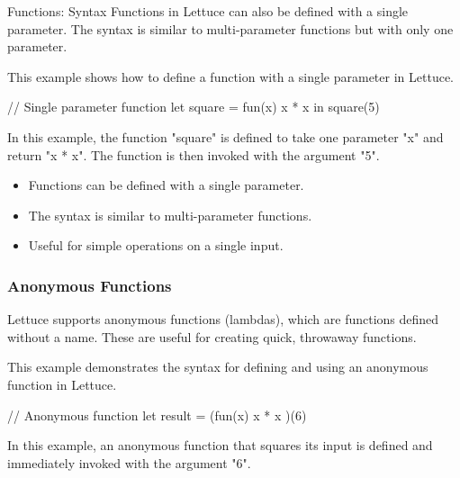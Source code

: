 \begin{notes}{Functions: Syntax}
    Functions in Lettuce can also be defined with a single parameter. The syntax is similar to multi-parameter functions but with only one parameter.
    
    \begin{highlight}
    
        This example shows how to define a function with a single parameter in Lettuce.
    
    \begin{code}[Lettuce]
    // Single parameter function
    let square = fun(x) {
        x * x
    } in
    square(5)
    \end{code}
    
        In this example, the function "square" is defined to take one parameter "x" and return "x * x". The function is then invoked with the argument "5".
    
        \begin{itemize}
            \item Functions can be defined with a single parameter.
            \item The syntax is similar to multi-parameter functions.
            \item Useful for simple operations on a single input.
        \end{itemize}
    
    \end{highlight}
    
    \subsubsection*{Anonymous Functions}
    
    Lettuce supports anonymous functions (lambdas), which are functions defined without a name. These are useful for creating quick, throwaway functions.
    
    \begin{highlight}
    
        This example demonstrates the syntax for defining and using an anonymous function in Lettuce.
    
    \begin{code}[Lettuce]
    // Anonymous function
    let result = (fun(x) { x * x })(6)
    \end{code}
    
        In this example, an anonymous function that squares its input is defined and immediately invoked with the argument "6".
    

\end{highlight}
\end{notes}
